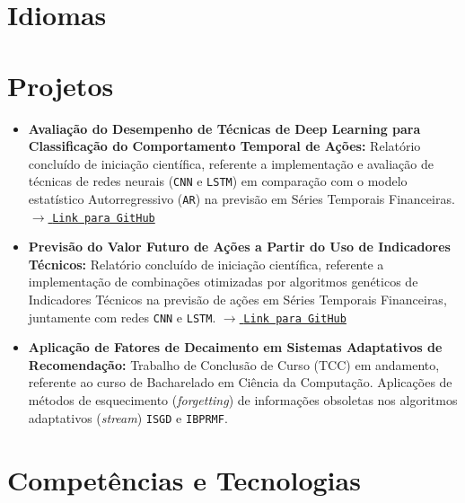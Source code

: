 \documentclass[letterpaper,11pt]{article}
\newcommand{\resumeItem}[2]{
  \item\small{
    \textbf{#1}{#2 \vspace{-2pt}}
  }
}
\newcommand{\resumeSubItem}[2]{\resumeItem{#1}{#2}\vspace{-4pt}}
\newcommand{\resumeSubHeadingListStart}{\begin{itemize}[leftmargin=*]}
\newcommand{\resumeSubHeadingListEnd}{\end{itemize}}
\begin{document}
  \section{Idiomas}
  \small{
  }
  
\newpage

\section{Projetos}
  \resumeSubHeadingListStart
    
    \resumeSubItem{Avaliação do Desempenho de Técnicas de Deep Learning para Classificação do Comportamento Temporal de Ações: }
      {\color{gray} Relatório concluído de iniciação científica, referente a implementação e avaliação de técnicas de redes neurais (\texttt{CNN} e \texttt{LSTM}) em comparação com o modelo estatístico Autorregressivo (\texttt{AR}) na previsão em Séries Temporais Financeiras. \href{https://github.com/gprzy/PETR4.SA-forecasting}{$\rightarrow$ \color{black}\texttt{Link para GitHub}}}
    \vspace{7pt}
    
    \resumeSubItem{Previsão do Valor Futuro de Ações a Partir do Uso de Indicadores Técnicos: }
      {\color{gray} Relatório concluído de iniciação científica, referente a implementação de combinações otimizadas por algoritmos genéticos de Indicadores Técnicos na previsão de ações em Séries Temporais Financeiras, juntamente com redes \texttt{CNN} e \texttt{LSTM}.
      \href{https://github.com/gprzy/ta-forecasting}{$\rightarrow$ \color{black}\texttt{Link para GitHub}}}
    \vspace{7pt}

    \resumeSubItem{Aplicação de Fatores de Decaimento em Sistemas Adaptativos de Recomendação: }
      {\color{gray} Trabalho de Conclusão de Curso (TCC) em andamento, referente ao curso de Bacharelado em Ciência da Computação. Aplicações de métodos de esquecimento (\textit{forgetting}) de informações obsoletas nos algoritmos adaptativos (\textit{stream}) \texttt{ISGD} e \texttt{IBPRMF}.}
    \vspace{7pt}
  \resumeSubHeadingListEnd
 
 \section{Competências e Tecnologias}
 
\end{document}
